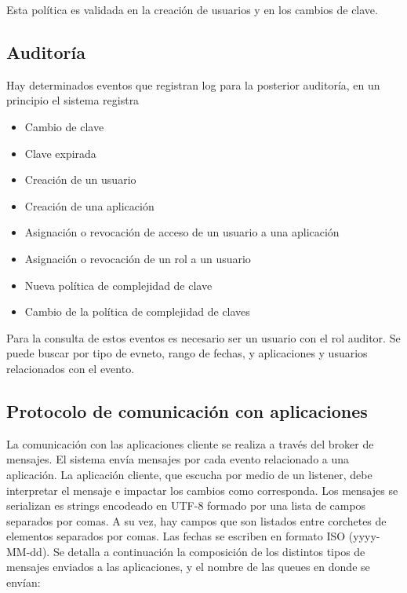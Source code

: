 Esta política es validada en la creación de usuarios y en los cambios de clave. 

\subsection{Auditoría}

Hay determinados eventos que registran log para la posterior auditoría, en un principio el sistema registra

\begin{itemize}
  \item Cambio de clave
  \item Clave expirada
  \item Creación de un usuario
  \item Creación de una aplicación
  \item Asignación o revocación de acceso de un usuario a una aplicación
  \item Asignación o revocación de un rol a un usuario
  \item Nueva política de complejidad de clave
  \item Cambio de la política de complejidad de claves
\end{itemize}

Para la consulta de estos eventos es necesario ser un usuario con el rol auditor.
Se puede buscar por tipo de evneto, rango de fechas, y aplicaciones y usuarios relacionados con el evento.

\subsection{Protocolo de comunicación con aplicaciones}

La comunicación con las aplicaciones cliente se realiza a través del broker de mensajes. El sistema envía mensajes
por cada evento relacionado a una aplicación. La aplicación cliente, que escucha por medio de un listener, debe
interpretar el mensaje e impactar los cambios como corresponda.
Los mensajes se serializan es strings encodeado en UTF-8 formado por una lista de campos separados
por comas. A su vez, hay campos que son listados entre corchetes de elementos separados por comas. Las fechas
se escriben en formato ISO (yyyy-MM-dd). Se detalla a continuación la composición de los distintos tipos
de mensajes enviados a las aplicaciones, y el nombre de las queues en donde se envían:

